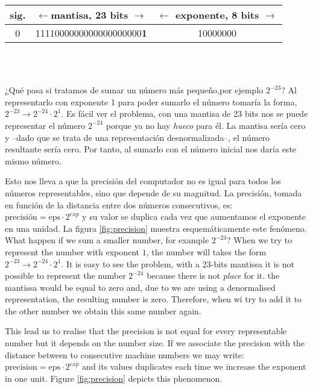 \begin{minipage}{\textwidth}
	\centering	
\begin{tabular}{|c||c||c|}
\hline
sig.&$\leftarrow$mantisa, 23 bits $\rightarrow$&$\leftarrow$ exponente, 8 bits $\rightarrow$\\
\hline
0&1111000000000000000000\textbf{1}&10000000\\
\hline
\end{tabular}\\
\ \\
\end{minipage}

\begin{paracol}{2}
¿Qué pasa si tratamos de sumar un número más pequeño,por ejemplo $2^{-23}$? Al representarlo con exponente 1 para poder sumarlo el número tomaría la forma, $2^{-23}\rightarrow 2^{-24}\cdot2^{1}$. Es fácil ver el problema, con una mantisa de 23 bits nos se puede representar el número $2^{-24}$ porque ya no hay \emph{hueco} para él. La mantisa sería cero y --dado que se trata de una representación desnormalizada--, el número resultante sería cero. Por tanto, al sumarlo con el número inicial nos daría este mismo número.

Esto nos lleva a que la precisión del computador no es igual para todos los números representables, sino que depende de su magnitud. La precisión, tomada en función de la distancia entre dos números consecutivos, es:\\ $\text{precisión} = \text{eps}\cdot 2^{exp}$ y su valor se duplica cada vez que aumentamos el exponente en una unidad. La figura \ref{fig:precision} muestra esquemáticamente este fenómeno.
\switchcolumn
What happen if we sum a smaller number, for example $2^{-23}$? When we try to represent the number with exponent $1$, the number will takes the form $2^{-23}\rightarrow 2^{-24}\cdot2^{1}$.  It is easy to see the problem, with a 23-bits mantissa it is not possible to represent the number $2^{-24}$ because there is not \emph{place} for it. the mantissa would be equal to zero and, due to we are using a denormalised representation, the resulting number is zero. Therefore, when wi try to add it to the other number we obtain this same number again.

This lead us to realise that the precision is not equal for every representable number but it depends on the number size. If we associate the precision with the distance between to consecutive machine numbers we may write: $\text{precision} = \text{eps}\cdot 2^{exp}$ and its values duplicates each time we increase the exponent in one unit. Figure \ref{fig:precision} depicts this phenomenon.  
\end{paracol}


